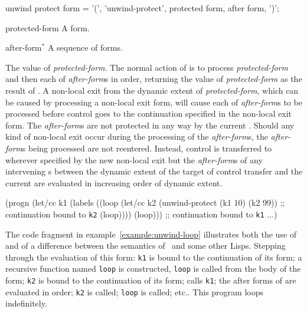 \begin{optDefinition}
%
\Syntax
\savesyntax\unwindprotectSyntax\vbox{\small\syntax
unwind protect form
   = '(', 'unwind-protect', protected form,
     {after form}, ')';
\endsyntax}
%
\begin{arguments}
    \item[protected-form] A form.
    \item[after-form$^*$] A sequence of forms.
\end{arguments}
%
\result%
The value of {\em protected-form}.
%
\remarks%
The normal action of  is to process {\em
    protected-form} and then each of {\em after-form}s in order, returning the
value of {\em protected-form} as the result of .  A
non-local exit from the dynamic extent of {\em protected-form}, which can be
caused by processing a non-local exit form, will cause each of {\em after-form}s
to be processed before control goes to the continuation specified in the
non-local exit form.  The {\em after-form}s are not protected in any way by the
current .  Should any kind of non-local exit occur
during the processing of the {\em after-form}s, the {\em after-form}s being
processed are not reentered.  Instead, control is transferred to wherever
specified by the new non-local exit but the {\em after-form}s of any intervening
s between the dynamic extent of the target of control
transfer and the current  are evaluated in increasing
order of dynamic extent.
%
\examples
%
\begin{example}
\label{example:unwind-loop}
{\small\syntax
(progn
  (let/cc k1
    (labels
      ((loop
         (let/cc k2 (unwind-protect (k1 10) (k2 99))
         ;; continuation bound to {\tt k2}
         (loop))))
      (loop)))
  ;; continuation bound to {\tt k1}
  ...)
\endsyntax}
\end{example}
%
The code fragment in example~\ref{example:unwind-loop} illustrates both the use
of  and of a difference between the semantics of
\eulisp\ and some other Lisps.  Stepping through the evaluation of this form:
{\tt k1} is bound to the continuation of its  form; a
recursive function named {\tt loop} is constructed, {\tt loop} is called from
the body of the  form; {\tt k2} is bound to the continuation
of its  form;  calls {\tt k1}; the
after forms of  are evaluated in order; {\tt k2} is
called; {\tt loop} is called; etc..  This program loops indefinitely.
%
\end{optDefinition}

